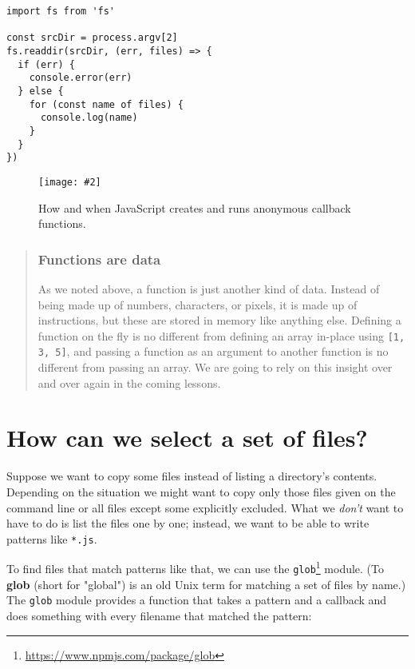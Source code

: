 \documentclass[krantzl]{krantz}
\newcommand{\figpdf}[4]{\begin{figure}%
\centering%
\texttt{[image: \#2]}%
\caption{#3}%
\label{#1}%
\end{figure}}
\newcommand{\glossref}[1]{\textbf{#1}}
\newenvironment{callout}{\savenotes\begin{tBox}\begin{quotation}\toggletrue{inbox}\renewcommand{\thempfootnote}{\arabic{footnote}}}{\end{quotation}\vspace{\baselineskip}\end{tBox}\togglefalse{inbox}\spewnotes}
\newcommand{\hreffoot}[2]{{#1}\footnote{\href{#2}{#2}}}
\begin{document}
\begin{lstlisting}[frame=single,frameround=tttt]
import fs from 'fs'

const srcDir = process.argv[2]
fs.readdir(srcDir, (err, files) => {
  if (err) {
    console.error(err)
  } else {
    for (const name of files) {
      console.log(name)
    }
  }
})
\end{lstlisting}


\figpdf{systems-programming-anonymous-functions}{./systems-programming/anonymous-functions.pdf}{How and when JavaScript creates and runs anonymous callback functions.}{0.6}

\begin{callout}


\subsubsection*{Functions are data}


As we noted above,
a function is just another kind of data.
Instead of being made up of numbers, characters, or pixels, it is made up of instructions,
but these are stored in memory like anything else.
Defining a function on the fly is no different from defining an array in-place using \texttt{[1, 3, 5]},
and passing a function as an argument to another function is no different from passing an array.
We are going to rely on this insight over and over again in the coming lessons.

\end{callout}

\section{How can we select a set of files?}\label{systems-programming-fileset}


Suppose we want to copy some files instead of listing a directory's contents.
Depending on the situation
we might want to copy only those files given on the command line
or all files except some explicitly excluded.
What we \emph{don't} want to have to do is list the files one by one;
instead,
we want to be able to write patterns like \texttt{*.js}.


To find files that match patterns like that,
we can use the \hreffoot{\texttt{glob}}{https://www.npmjs.com/package/glob} module.
(To \glossref{glob} (short for "global") is an old Unix term for matching a set of files by name.)
The \texttt{glob} module provides a function that takes a pattern and a callback
and does something with every filename that matched the pattern:
\end{document}
